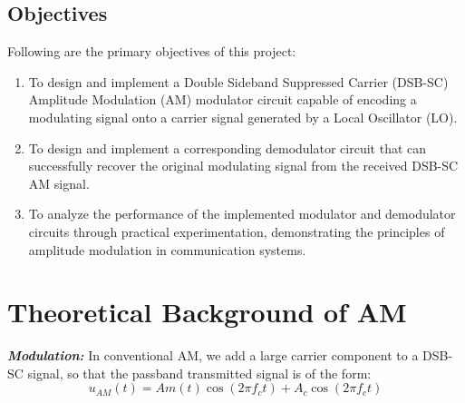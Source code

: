 \documentclass[conference]{IEEEtran}
\begin{document}
\subsection{Objectives}
Following are the primary objectives of this project: 
\begin{enumerate}
    \item To design and implement a Double Sideband Suppressed Carrier (DSB-SC) Amplitude Modulation (AM) modulator circuit capable of encoding a modulating signal onto a carrier signal generated by a Local Oscillator (LO).
    \item To design and implement a corresponding demodulator circuit that can successfully recover the original modulating signal from the received DSB-SC AM signal.
    \item To analyze the performance of the implemented modulator and demodulator circuits through practical experimentation, demonstrating the principles of amplitude modulation in communication systems.
    
\end{enumerate}


\section{Theoretical Background of AM}


\textbf{\textit{Modulation: }}
In conventional AM, we add a large carrier component to a DSB-SC signal, so that the passband transmitted signal is of the form: 
\[ u_{AM}(t) = A m(t) \cos(2\pi f_c t) + A_c \cos(2\pi f_c t) \]
\end{document}
